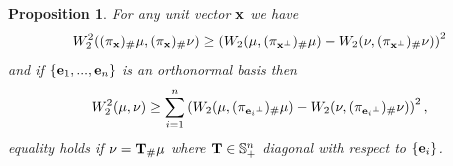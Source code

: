 \documentclass{amsart}
\numberwithin{equation}{section}
\newcommand\bT{{\bf T}}
\newcommand\tr{{\operatorname{tr}}}
\theoremstyle{plain}
\newtheorem{proposition}[subsection]{Proposition}
\theoremstyle{definition}
\begin{document}
\begin{proposition}\label{prop:wasserstein_upper_est_and_eq_cond}
For any unit vector ${\bf x}$ we have 
\begin{equation}
     W^2_2( (\pi_{{\bf x}})_{\#}\mu, (\pi_{{\bf x}})_{\#}\nu) \geq \left(W_2(\mu, (\pi_{ {\bf x}^{\perp}})_{\#}\mu) - W_2(\nu, (\pi_{{\bf x}^{\perp}})_{\#}\nu) \right)^{2}
\end{equation}
and if $\{{\bf e}_1,...,{\bf e}_n\}$ is an orthonormal basis then 
\begin{equation}\label{prop:est:was:gen_proj_rel}
    W^2_2(\mu,\nu)\geq \sum^n_{i=1} \left(W_2(\mu, (\pi_{{{\bf e}_i}^{\perp}})_{\#}\mu) - W_2(\nu, (\pi_{{{\bf e}_i}^{\perp}})_{\#}\nu) \right)^{2}, 
\end{equation}
equality holds if $\nu=\bT_{\#}\mu$ where $\bT \in {\mathbb S}^n_{+}$ diagonal with respect to $\{{\bf e}_i\}$.  
\end{proposition}
\end{document}
